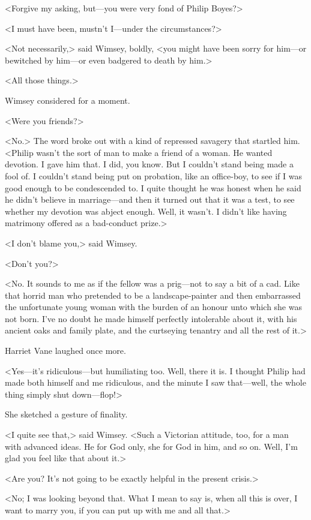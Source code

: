 <Forgive my asking, but—you were very fond of Philip Boyes?>

<I must have been, mustn't I—under the circumstances?>

<Not necessarily,> said Wimsey, boldly, <you might have been sorry for him—or bewitched by him—or even badgered to death by him.>

<All those things.>

Wimsey considered for a moment.

<Were you friends?>

<No.> The word broke out with a kind of repressed savagery that startled him. <Philip wasn't the sort of man to make a friend of a woman. He wanted devotion. I gave him that. I did, you know. But I couldn't stand being made a fool of. I couldn't stand being put on probation, like an office-boy, to see if I was good enough to be condescended to. I quite thought he was honest when he said he didn't believe in marriage—and then it turned out that it was a test, to see whether my devotion was abject enough. Well, it wasn't. I didn't like having matrimony offered as a bad-conduct prize.>

<I don't blame you,> said Wimsey.

<Don't you?>

<No. It sounds to me as if the fellow was a prig—not to say a bit of a cad. Like that horrid man who pretended to be a landscape-painter and then embarrassed the unfortunate young woman with the burden of an honour unto which she was not born. I've no doubt he made himself perfectly intolerable about it, with his ancient oaks and family plate, and the curtseying tenantry and all the rest of it.>

Harriet Vane laughed once more.

<Yes—it's ridiculous—but humiliating too. Well, there it is. I thought Philip had made both himself and me ridiculous, and the minute I saw that—well, the whole thing simply shut down—flop!>

She sketched a gesture of finality.

<I quite see that,> said Wimsey. <Such a Victorian attitude, too, for a man with advanced ideas. He for God only, she for God in him, and so on. Well, I'm glad you feel like that about it.>

<Are you? It's not going to be exactly helpful in the present crisis.>

<No; I was looking beyond that. What I mean to say is, when all this is over, I want to marry you, if you can put up with me and all that.>


